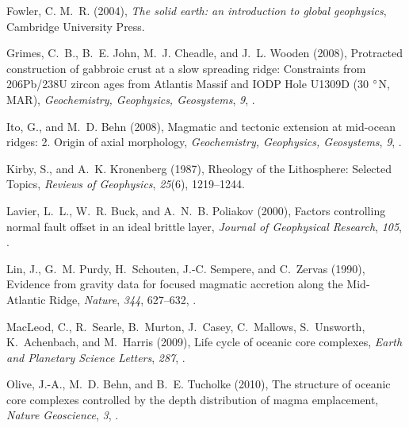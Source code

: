 \documentclass[draft,gc]{agutex}
\begin{document}
\begin{article}
\begin{thebibliography}{39}
Fowler, C. M.~R. (2004), \textit{The solid earth: an introduction to global
  geophysics}, Cambridge University Press.

Grimes, C.~B., B.~E. John, M.~J. Cheadle, and J.~L. Wooden (2008), {Protracted
  construction of gabbroic crust at a slow spreading ridge: Constraints from
  206Pb/238U zircon ages from Atlantis Massif and IODP Hole U1309D (30
  $\degree$N, MAR)}, \textit{Geochemistry, Geophysics, Geosystems}, \textit{9},
  .

Ito, G., and M.~D. Behn (2008), {Magmatic and tectonic extension at mid-ocean
  ridges: 2. Origin of axial morphology}, \textit{Geochemistry, Geophysics,
  Geosystems}, \textit{9}, .

Kirby, S., and A.~K. Kronenberg (1987), {Rheology of the Lithosphere: Selected
  Topics}, \textit{Reviews of Geophysics}, \textit{25}(6), 1219--1244.

Lavier, L.~L., W.~R. Buck, and A.~N.~B. Poliakov (2000), {Factors controlling
  normal fault offset in an ideal brittle layer}, \textit{Journal of
  Geophysical Research}, \textit{105}, .

Lin, J., G.~M. Purdy, H.~Schouten, J.-C. Sempere, and C.~Zervas (1990),
  {Evidence from gravity data for focused magmatic accretion along the
  Mid-Atlantic Ridge}, \textit{Nature}, \textit{344}, 627--632,
  .

MacLeod, C., R.~Searle, B.~Murton, J.~Casey, C.~Mallows, S.~Unsworth,
  K.~Achenbach, and M.~Harris (2009), {Life cycle of oceanic core complexes},
  \textit{Earth and Planetary Science Letters}, \textit{287},
  .

Olive, J.-A., M.~D. Behn, and B.~E. Tucholke (2010), {The structure of oceanic
  core complexes controlled by the depth distribution of magma emplacement},
  \textit{Nature Geoscience}, \textit{3}, .


\end{thebibliography}
\end{article}
\end{document}
